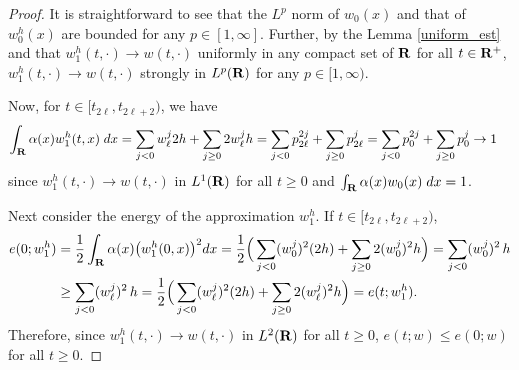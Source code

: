 \documentclass[11pt]{amsart}
\def\R{{\bf R}}
\def\R{\mathbb{R}}
\def\R{{\bf R}}
\begin{document}
\begin{proof}
It is straightforward to see that the $L^p$ norm of $w_0(x)$ and that of $w_0^h(x)$ are bounded for any $p\in [1,\infty]$. Further, by the Lemma \ref{uniform_est} and that $w_1^h(t,\cdot) \rightarrow w(t,\cdot)$ uniformly in any compact set of $\R$ for all $t\in\R^+$, $w_1^h(t,\cdot) \rightarrow w(t,\cdot)$ strongly in $L^p(\R)$ for any $p \in [1,\infty)$.

Now, for $t\in [t_{2\ell}, t_{2\ell+2})$, we have
\begin{align*}
\int_\R \alpha(x)w_1^h(t,x) \; dx &= \sum_{j<0}w^j_\ell2h + 
\sum_{j\ge0}2w^j_\ell h = \sum_{j<0}p^{2j}_{2\ell} +
\sum_{j\ge0}p^j_{2\ell} = \sum_{j<0}p^{2j}_{0} + \sum_{j\ge0}p^j_{0} \rightarrow 1
\end{align*}
since $w_1^h(t,\cdot) \rightarrow w(t,\cdot)$ in $L^1(\R)$ for all $t\ge0$ and $\int_\R\alpha(x) w_0(x) \; dx=1$.

Next consider the energy of the approximation $w^h_1$. If $t\in [t_{2\ell}, t_{2\ell+2})$,
\begin{align*}
e(0;w^h_1) &= \frac{1}{2} \int_\R \alpha(x) \big(w^h_1(0,x)\big)^2dx = \frac{1}{2} \Big( \sum_{j<0}(w_0^{j})^2(2h) +\sum_{j\ge0}2(w_0^{j})^2h \Big)=\sum_{j<0}(w_0^{j})^2\,h\\
&\ge \sum_{j<0}(w_\ell^{j})^2\,h =\frac{1}{2} \Big( \sum_{j<0}(w_\ell^{j})^2(2h) +\sum_{j\ge0}2(w_\ell^{j})^2h \Big) = e(t;w^h_1).
\end{align*}
Therefore, since $w_1^h(t,\cdot) \rightarrow w(t,\cdot)$ in $L^2(\R)$ for all $t\ge0$, $e(t;w)\le e(0;w)$ for all $t\ge0$.
\end{proof}
\end{document}
